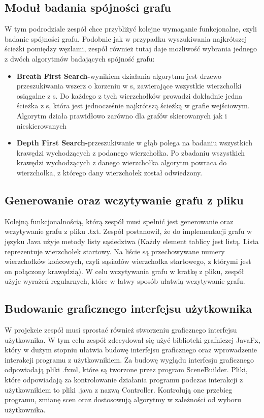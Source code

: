 \documentclass[10pt]{article}
\begin{document}
\subsection{Moduł badania spójności grafu}
W tym podrodziale zespół chce przybliżyć kolejne wymaganie funkcjonalne, czyli badanie spójności grafu. Podobnie jak w przypadku wyszukiwania najkrótszej ścieżki pomiędzy węzłami, zespół również tutaj daje możliwość wybrania jednego z dwóch algorytmów badających spójność grafu:
\begin{itemize}
    \item \textbf{Breath First Search-}wynikiem działania algorytmu jest drzewo przeszukiwania wszerz o korzeniu w s, zawierające wszystkie wierzchołki osiągalne z s. Do każdego z tych wierzchołków prowadzi dokładnie jedna ścieżka z s, która jest jednocześnie najkrótszą ścieżką w grafie wejściowym. Algorytm działa prawidłowo zarówno dla grafów skierowanych jak i nieskierowanych
    \item \textbf{Depth First Search-}przeszukiwanie w głąb polega na badaniu wszystkich krawędzi wychodzących z podanego wierzchołka. Po zbadaniu wszystkich krawędzi wychodzących z danego wierzchołka algorytm powraca do wierzchołka, z którego dany wierzchołek został odwiedzony.
\end{itemize}
\subsection{Generowanie oraz wczytywanie grafu z pliku}
Kolejną funkcjonalnością, którą zespół musi spełnić jest generowanie oraz wczytywanie grafu z pliku .txt. Zespół postanowił, że do implementacji grafu w języku Java użyje metody listy sąsiedztwa (Każdy element tablicy jest listą. Lista reprezentuje wierzchołek startowy. Na liście są przechowywane numery wierzchołków końcowych, czyli sąsiadów wierzchołka startowego, z którymi jest on połączony krawędzią). W celu wczytywania grafu w kratkę z pliku, zespół użyje wyrażeń regularnych, które w łatwy sposób ułatwią wczytywanie grafu.
\subsection{Budowanie graficznego interfejsu użytkownika}
W projekcie zespół musi sprostać również stworzeniu graficznego interfejsu użytkownika. W tym celu zespół zdecydował się użyć biblioteki grafniczej JavaFx, który w dużym stopniu ułatwia budowę interfejsu graficznego oraz wprowadzenie interakcji programu z użytkownikiem. Za budowę wyglądu interfesju graficznego odpowiadają pliki .fxml, które są tworzone przez program SceneBuilder. Pliki, które odpowiadają za kontrolowanie działania programu podczas interakcji z użytkownikiem to pliki .java z nazwą Controller. Kontrolują one przebieg programu, zmianę scen oraz dostosowują algorytmy w zależności od wyboru użytkownika.
\newpage
\end{document}
